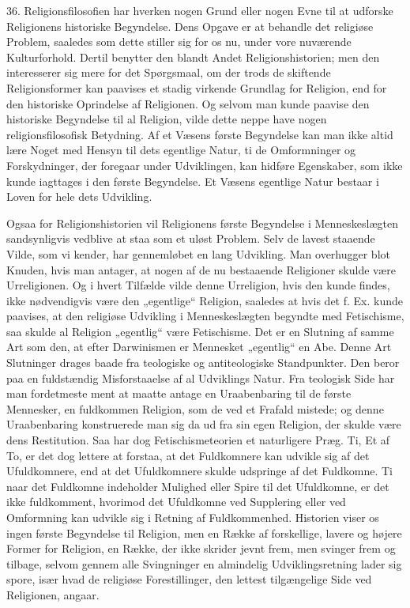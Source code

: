 \documentclass[12pt,a4paper,openany]{book}
\newcommand{\opage}[1]{\marginnote{\footnotesize\textit{[#1]}}}
\begin{document}
36. Religionsfilosofien har hverken nogen Grund eller nogen Evne til at
udforske Religionens historiske Begyndelse. Dens Opgave er at behandle
det religiøse Problem, saaledes som dette stiller sig for os nu, under
vore nuværende Kulturforhold. Dertil benytter den blandt Andet
Religionshistorien; men den interesserer sig mere for det Spørgsmaal, om
der trods de skiftende Religionsformer kan paavises et stadig virkende
Grundlag for Religion, end for den historiske Oprindelse af Religionen.
Og selvom man kunde paavise den historiske Begyndelse til al Religion,
vilde dette neppe have nogen religionsfilosofisk Betydning. Af et Væsens
første Begyndelse kan man ikke altid lære Noget med Hensyn til dets
egentlige Natur, ti de Omformninger og Forskydninger, der foregaar under
Udviklingen, kan hidføre Egenskaber, som ikke kunde iagttages i den
første Begyndelse. Et Væsens egentlige Natur bestaar i Loven for hele
dets Udvikling.

Ogsaa for Religionshistorien vil Religionens første Begyndelse i
Menneskeslægten sandsynligvis vedblive at staa som et uløst Problem.
Selv de lavest staaende Vilde, som vi kender, har gennemløbet en lang
Udvikling. Man overhugger blot Knuden, hvis man antager, at nogen af de
nu bestaaende Religioner skulde være Urreligionen. Og i hvert Tilfælde
vilde denne Urreligion, hvis den kunde findes, ikke nødvendigvis være
den „egentlige“ Religion, saaledes at hvis det f. Ex. kunde paavises, at
den religiøse Udvikling i Menneskeslægten begyndte med Fetischisme, saa
skulde al Religion „egentlig“ være Fetischisme. Det er en Slutning af
samme Art som den, at efter Darwinismen er Mennesket „egentlig“ en Abe.
Denne Art Slutninger drages baade fra teologiske
\opage{86}og antiteologiske Standpunkter. Den beror paa en fuldstændig
Misforstaaelse af al Udviklings Natur. Fra teologisk Side har man
fordetmeste ment at maatte antage en Uraabenbaring til de første
Mennesker, en fuldkommen Religion, som de ved et Frafald mistede; og
denne Uraabenbaring konstruerede man sig da ud fra sin egen Religion,
der skulde være dens Restitution. Saa har dog Fetischismeteorien et
naturligere Præg. Ti, Et af To, er det dog lettere at forstaa, at det
Fuldkomnere kan udvikle sig af det Ufuldkomnere, end at det Ufuldkomnere
skulde udspringe af det Fuldkomne. Ti naar det Fuldkomne indeholder
Mulighed eller Spire til det Ufuldkomne, er det ikke fuldkomment,
hvorimod det Ufuldkomne ved Supplering eller ved Omformning kan udvikle
sig i Retning af Fuldkommenhed. Historien viser os ingen første
Begyndelse til Religion, men en Række af forskellige, lavere og højere
Former for Religion, en Række, der ikke skrider jevnt frem, men svinger
frem og tilbage, selvom gennem alle Svingninger en almindelig
Udviklingsretning lader sig spore, især hvad de religiøse
Forestillinger, den lettest tilgængelige Side ved Religionen, angaar.
\end{document}
